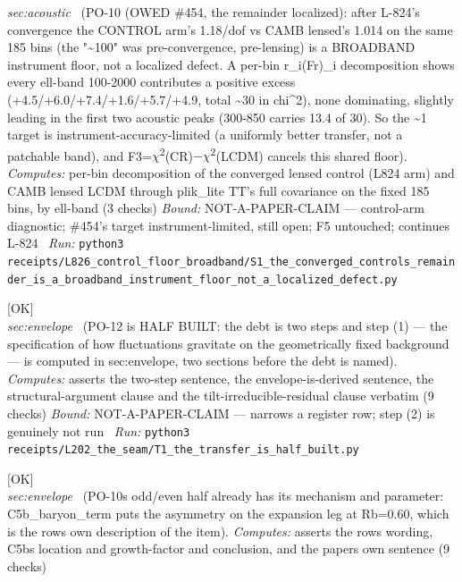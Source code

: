 \begin{description}
\textit{sec:acoustic} \ (PO-10 (OWED \#454, the remainder localized): after L-824's convergence the CONTROL arm's 1.18/dof vs CAMB lensed's 1.014 on the same 185 bins (the "\textasciitilde{}100" was pre-convergence, pre-lensing) is a BROADBAND instrument floor, not a localized defect. A per-bin r\_i(Fr)\_i decomposition shows every ell-band 100-2000 contributes a positive excess (+4.5/+6.0/+7.4/+1.6/+5.7/+4.9, total \textasciitilde{}30 in chi\textasciicircum{}2), none dominating, slightly leading in the first two acoustic peaks (300-850 carries 13.4 of 30). So the \textasciitilde{}1 target is instrument-accuracy-limited (a uniformly better transfer, not a patchable band), and F3=\ensuremath{\chi}\textsuperscript{2}(CR)\ensuremath{-}\ensuremath{\chi}\textsuperscript{2}(LCDM) cancels this shared floor). 
\emph{Computes:} per-bin decomposition of the converged lensed control (L824 arm) and CAMB lensed LCDM through plik\_lite TT's full covariance on the fixed 185 bins, by ell-band (3 checks)
 \emph{Bound:} NOT-A-PAPER-CLAIM --- control-arm diagnostic; \#454's target instrument-limited, still open; F5 untouched; continues L-824
\ \emph{Run:} \texttt{python3 receipts/L826\_control\_floor\_broadband/S1\_the\_converged\_controls\_remainder\_is\_a\_broadband\_instrument\_floor\_not\_a\_localized\_defect.py}
\item[\label{rcpt:T1_the_transfer_is_half_built}\textbf{}\quad\texttt{T1\_the\_transfer\_is\_half\_built}]\hfill\textsf{[OK]}\\
\textit{sec:envelope} \ (PO-12 is HALF BUILT: the debt is two steps and step (1) --- the specification of how fluctuations gravitate on the geometrically fixed background --- is computed in sec:envelope, two sections before the debt is named). 
\emph{Computes:} asserts the two-step sentence, the envelope-is-derived sentence, the structural-argument clause and the tilt-irreducible-residual clause verbatim (9 checks)
 \emph{Bound:} NOT-A-PAPER-CLAIM --- narrows a register row; step (2) is genuinely not run
\ \emph{Run:} \texttt{python3 receipts/L202\_the\_seam/T1\_the\_transfer\_is\_half\_built.py}
\item[\rcptlabel{C12_the_odd_even_half_has_its_parameter}{P15R98}\textbf{P15R98}\quad\texttt{C12\_the\_odd\_even\_half\_has\_its\_parameter}]\hfill\textsf{[OK]}\\
\textit{sec:envelope} \ (PO-10s odd/even half already has its mechanism and parameter: C5b\_baryon\_term puts the asymmetry on the expansion leg at Rb=0.60, which is the rows own description of the item). 
\emph{Computes:} asserts the rows wording, C5bs location and growth-factor and conclusion, and the papers own sentence (9 checks)

\end{description}
